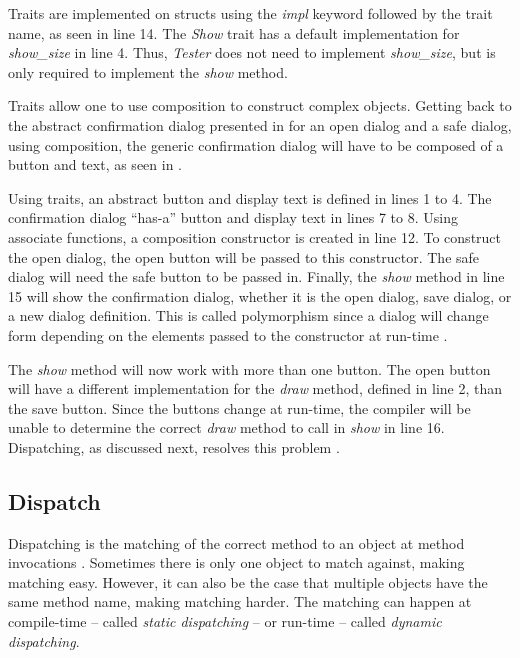 Traits are implemented on structs using the \textit{impl} keyword followed by the trait name, as seen in line 14.
The \textit{Show} trait has a default implementation for \textit{show\_size} in line 4.
Thus, \textit{Tester} does not need to implement \textit{show\_size}, but is only required to implement the \textit{show} method.

Traits allow one to use composition to construct complex objects.
Getting back to the abstract confirmation dialog presented in  for an open dialog and a safe dialog, using composition, the generic confirmation dialog will have to be composed of a button and text, as seen in .


Using traits, an abstract button and display text is defined in lines 1 to 4.
The confirmation dialog ``has-a'' \cite{malik_09_01} button and display text in lines 7 to 8.
Using associate functions\footnotemark[\ref{associate}], a composition constructor is created in line 12.
To construct the open dialog, the open button will be passed to this constructor.
The safe dialog will need the safe button to be passed in.
Finally, the \textit{show} method in line 15 will show the confirmation dialog, whether it is the open dialog, save dialog, or a new dialog definition.
This is called polymorphism since a dialog will change form depending on the elements passed to the constructor at run-time \cite{savitch_15_01,malik_09_01,gamma_94_01}.

The \textit{show} method will now work with more than one button.
The open button will have a different implementation for the \textit{draw} method, defined in line 2, than the save button.
Since the buttons change at run-time, the compiler will be unable to determine the correct \textit{draw} method to call in \textit{show} in line 16.
Dispatching, as discussed next, resolves this problem \cite{pierce_02_01}.

\subsection{Dispatch}
Dispatching is the matching of the correct method to an object at method invocations \cite{driesen_95_01}.
Sometimes there is only one object to match against, making matching easy.
However, it can also be the case that multiple objects have the same method name, making matching harder.
The matching can happen at compile-time -- called \textit{static dispatching} -- or run-time -- called \textit{dynamic dispatching}.

